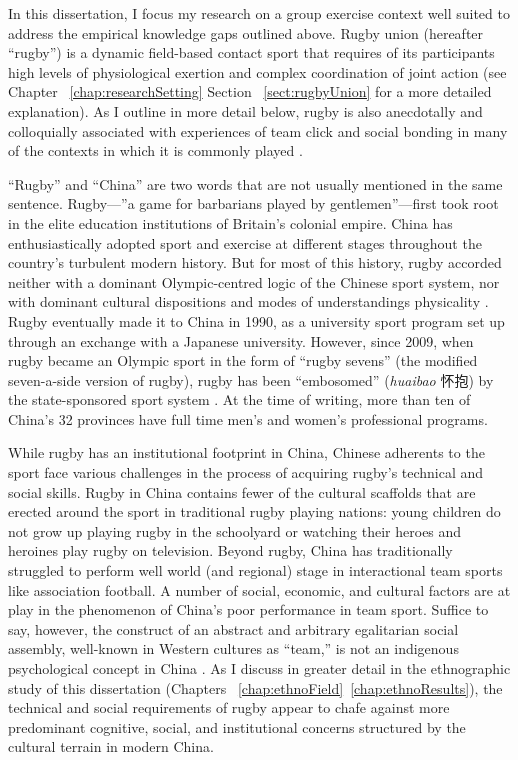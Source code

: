 \begin{CJK}{UTF8}{gbsn}
In this dissertation, I focus my research on a group exercise context well suited to address the empirical knowledge gaps outlined above.  Rugby union (hereafter ``rugby'') is a dynamic field-based contact sport that requires of its participants high levels of physiological exertion and complex coordination of joint action (see Chapter ~\ref{chap:researchSetting} Section ~\ref{sect:rugbyUnion} for a more detailed explanation). As I outline in more detail below, rugby is also anecdotally and colloquially associated with experiences of team click and social bonding in many of the contexts in which it is commonly played \citep{Dunning2005}.

``Rugby'' and ``China'' are two words that are not usually mentioned in the same sentence.  Rugby---''a game for barbarians played by gentlemen''---first took root in the elite education institutions of Britain's colonial empire.  China has enthusiastically adopted sport and exercise at different stages throughout the country's turbulent modern history. But for most of this history, rugby accorded neither with a dominant Olympic-centred logic of the Chinese sport system, nor with dominant cultural dispositions and modes of understandings physicality \citep[derived from Confucian and Daoist traditions of thought, see][]{Morris2004}.  Rugby eventually made it to China in 1990, as a university sport program set up through an exchange with a Japanese university.  However, since 2009, when rugby became an Olympic sport in the form of ``rugby sevens'' (the modified seven-a-side version of rugby), rugby has been ``embosomed'' (\textit{huaibao} 怀抱) by the state-sponsored sport system \citep{Xu2010}.  At the time of writing, more than ten of China's 32 provinces have full time men's and women's professional programs.

While rugby has an institutional footprint in China, Chinese adherents to the sport face various challenges in the process of acquiring rugby's technical and social skills.  Rugby in China contains fewer of the cultural scaffolds that are erected around the sport in traditional rugby playing nations: young children do not grow up playing rugby in the schoolyard or watching their heroes and heroines play rugby on television. Beyond rugby, China has traditionally struggled to perform well world (and regional) stage in interactional team sports like association football.  A number of social, economic, and cultural factors are at play in the phenomenon of China's poor performance in team sport.  Suffice to say, however, the construct of an abstract and arbitrary egalitarian social assembly, well-known in Western cultures as ``team,'' is not an indigenous psychological concept in China \cite{Liu2009}.  As I discuss in greater detail in the ethnographic study of this dissertation (Chapters ~\ref{chap:ethnoField}\nobreakdash~\ref{chap:ethnoResults}), the technical and social requirements of rugby appear to chafe against more predominant cognitive, social, and institutional concerns structured by the cultural terrain in modern China.


\end{CJK}
